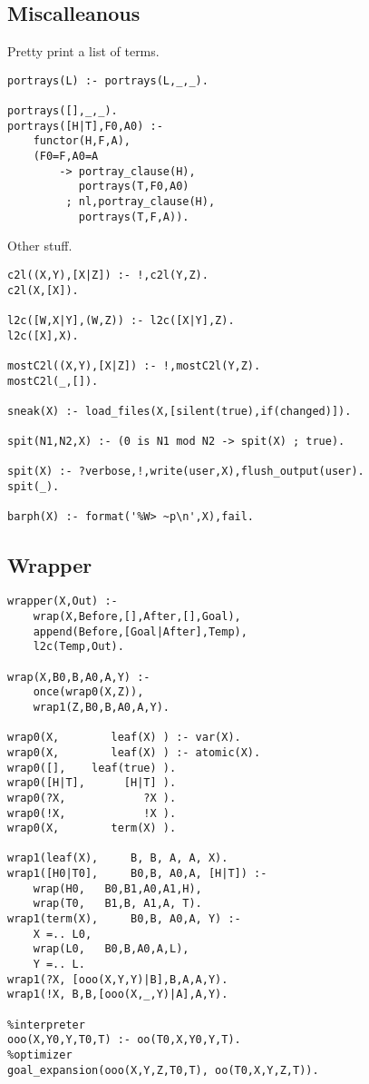 \documentclass[twocolumn,global]{svjour}
\begin{document}
\subsection{ Miscalleanous
}
 Pretty print a list of terms.  \begin{Verbatim}
portrays(L) :- portrays(L,_,_).

portrays([],_,_).
portrays([H|T],F0,A0) :-
    functor(H,F,A),
    (F0=F,A0=A
        -> portray_clause(H),
           portrays(T,F0,A0)
         ; nl,portray_clause(H),
           portrays(T,F,A)).
\end{Verbatim}
 Other stuff.  \begin{Verbatim}
c2l((X,Y),[X|Z]) :- !,c2l(Y,Z).
c2l(X,[X]).

l2c([W,X|Y],(W,Z)) :- l2c([X|Y],Z).
l2c([X],X).

mostC2l((X,Y),[X|Z]) :- !,mostC2l(Y,Z).
mostC2l(_,[]).

sneak(X) :- load_files(X,[silent(true),if(changed)]).

spit(N1,N2,X) :- (0 is N1 mod N2 -> spit(X) ; true).

spit(X) :- ?verbose,!,write(user,X),flush_output(user).
spit(_).

barph(X) :- format('%W> ~p\n',X),fail.
\end{Verbatim}
\subsection{ Wrapper }\begin{Verbatim}
wrapper(X,Out) :-
    wrap(X,Before,[],After,[],Goal),
    append(Before,[Goal|After],Temp),
    l2c(Temp,Out).

wrap(X,B0,B,A0,A,Y) :-
    once(wrap0(X,Z)),
    wrap1(Z,B0,B,A0,A,Y).

wrap0(X,        leaf(X) ) :- var(X).
wrap0(X,        leaf(X) ) :- atomic(X).
wrap0([],    leaf(true) ).
wrap0([H|T],      [H|T] ).
wrap0(?X,            ?X ).
wrap0(!X,            !X ).
wrap0(X,        term(X) ).

wrap1(leaf(X),     B, B, A, A, X).
wrap1([H0|T0],     B0,B, A0,A, [H|T]) :-
    wrap(H0,   B0,B1,A0,A1,H),
    wrap(T0,   B1,B, A1,A, T).
wrap1(term(X),     B0,B, A0,A, Y) :-
    X =.. L0,
    wrap(L0,   B0,B,A0,A,L),
    Y =.. L.
wrap1(?X, [ooo(X,Y,Y)|B],B,A,A,Y).
wrap1(!X, B,B,[ooo(X,_,Y)|A],A,Y).

%interpreter
ooo(X,Y0,Y,T0,T) :- oo(T0,X,Y0,Y,T).
%optimizer
goal_expansion(ooo(X,Y,Z,T0,T), oo(T0,X,Y,Z,T)).
\end{Verbatim}
\end{document}
